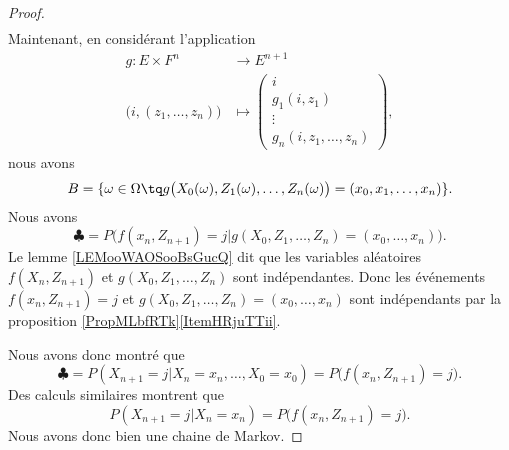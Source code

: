 \begin{proof}
\begin{subequations}
\begin{align}
        \end{align}
    \end{subequations}
    Maintenant, en considérant l'application
    \begin{equation}
        \begin{aligned}
            g\colon E\times F^n&\to E^{n+1} \\
            \big( i,(z_1,\ldots, z_n) \big)&\mapsto \begin{pmatrix}
                i    \\ 
                g_1(i,z_1)    \\ 
                \vdots    \\ 
                g_n(i,z_1,\ldots, z_n)    
            \end{pmatrix},
        \end{aligned}
    \end{equation}
    nous avons 
    \begin{equation}
        B=\{ \omega\in\Omega\tq g\big( X_0(\omega), Z_1(\omega),\ldots, Z_n(\omega)  \big)=(x_0,x_1,\ldots, x_n) \}.
    \end{equation}
    Nous avons
    \begin{equation}
        \clubsuit=P\big( f(x_n,Z_{n+1})=j|g(X_0,Z_1,\ldots, Z_n)=(x_0,\ldots, x_n) \big).
    \end{equation}
    Le lemme \ref{LEMooWAOSooBsGucQ} dit que les variables aléatoires \( f(X_n, Z_{n+1})\) et \( g(X_0,Z_1,\ldots, Z_n)\) sont indépendantes. Donc les événements \( f(x_n,Z_{n+1})=j\) et \( g(X_0,Z_1,\ldots, Z_n)=(x_0,\ldots, x_n)\) sont indépendants par la proposition \ref{PropMLbfRTk}\ref{ItemHRjuTTii}.

    Nous avons donc montré que
    \begin{equation}
        \clubsuit=P(X_{n+1}=j|X_n=x_n,\ldots, X_0=x_0)=P\big( f(x_n,Z_{n+1})=j \big).
    \end{equation}
    Des calculs similaires montrent que
    \begin{equation}
        P(X_{n+1}=j|X_n=x_n)=P\big( f(x_n,Z_{n+1})=j \big).
    \end{equation}
    Nous avons donc bien une chaine de Markov.


\end{proof}
